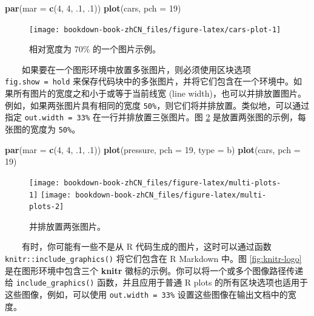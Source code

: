 \documentclass[
  12pt,
]{krantz}
\newenvironment{Shaded}{\begin{snugshade}}{\end{snugshade}}
\newcommand{\AttributeTok}[1]{\textcolor[rgb]{0.13,0.29,0.53}{#1}}
\newcommand{\DecValTok}[1]{\textcolor[rgb]{0.00,0.00,0.81}{#1}}
\newcommand{\FunctionTok}[1]{\textcolor[rgb]{0.13,0.29,0.53}{\textbf{#1}}}
\newcommand{\NormalTok}[1]{#1}
\newcommand{\StringTok}[1]{\textcolor[rgb]{0.31,0.60,0.02}{#1}}
\theoremstyle{definition}
\theoremstyle{definition}
\theoremstyle{definition}
\theoremstyle{definition}
\theoremstyle{remark}
\begin{document}
\begin{Shaded}
\begin{Highlighting}[]
\FunctionTok{par}\NormalTok{(}\AttributeTok{mar =} \FunctionTok{c}\NormalTok{(}\DecValTok{4}\NormalTok{, }\DecValTok{4}\NormalTok{, .}\DecValTok{1}\NormalTok{, .}\DecValTok{1}\NormalTok{))}
\FunctionTok{plot}\NormalTok{(cars, }\AttributeTok{pch =} \DecValTok{19}\NormalTok{)}
\end{Highlighting}
\end{Shaded}

\begin{figure}
\texttt{[image: bookdown-book-zhCN\_files/figure-latex/cars-plot-1]} \caption{相对宽度为 70\% 的一个图片示例。}\label{fig:cars-plot}
\end{figure}

  如果要在一个图形环境中放置多张图片，则必须使用区块选项 \texttt{fig.show\ =\ \textquotesingle{}hold\textquotesingle{}} 来保存代码块中的多张图片，并将它们包含在一个环境中。如果所有图片的宽度之和小于或等于当前线宽 (line width)，也可以并排放置图片。例如，如果两张图片具有相同的宽度 \texttt{50\%}，则它们将并排放置。类似地，可以通过指定 \texttt{out.width\ =\ \textquotesingle{}33\%\textquotesingle{}} 在一行并排放置三张图片。图 \ref{fig:multi-plots} 是放置两张图的示例，每张图的宽度为 \texttt{50\%}。

\begin{Shaded}
\begin{Highlighting}[]
\FunctionTok{par}\NormalTok{(}\AttributeTok{mar =} \FunctionTok{c}\NormalTok{(}\DecValTok{4}\NormalTok{, }\DecValTok{4}\NormalTok{, .}\DecValTok{1}\NormalTok{, .}\DecValTok{1}\NormalTok{))}
\FunctionTok{plot}\NormalTok{(pressure, }\AttributeTok{pch =} \DecValTok{19}\NormalTok{, }\AttributeTok{type =} \StringTok{\textquotesingle{}b\textquotesingle{}}\NormalTok{)}
\FunctionTok{plot}\NormalTok{(cars, }\AttributeTok{pch =} \DecValTok{19}\NormalTok{)}
\end{Highlighting}
\end{Shaded}

\begin{figure}
\texttt{[image: bookdown-book-zhCN\_files/figure-latex/multi-plots-1]} \texttt{[image: bookdown-book-zhCN\_files/figure-latex/multi-plots-2]} \caption{并排放置两张图片。}\label{fig:multi-plots}
\end{figure}

  有时，你可能有一些不是从 R 代码生成的图片，这时可以通过函数 \texttt{knitr::include\_graphics()} 将它们包含在 R Markdown 中。图 \ref{fig:knitr-logo} 是在图形环境中包含三个 \textbf{knitr} 徽标的示例。你可以将一个或多个图像路径传递给 \texttt{include\_graphics()} 函数，并且应用于普通 R plots 的所有区块选项也适用于这些图像，例如，可以使用 \texttt{out.width\ =\ \textquotesingle{}33\%\textquotesingle{}} 设置这些图像在输出文档中的宽度。
\end{document}
